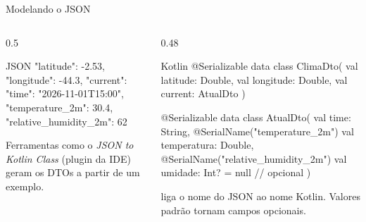 \documentclass[aspectratio=169,10pt]{beamer}
\begin{document}
\begin{frame}[fragile]{Modelando o JSON}
  \begin{columns}[T]
    \begin{column}{0.5\textwidth}
\begin{codigo}[title=Resposta da Open-Meteo (resumo)]{JSON}
{
  "latitude": -2.53,
  "longitude": -44.3,
  "current": {
    "time": "2026-11-01T15:00",
    "temperature_2m": 30.4,
    "relative_humidity_2m": 62
  }
}
\end{codigo}
      \begin{dica}
        Ferramentas como o \emph{JSON to Kotlin Class} (plugin da IDE) geram os DTOs a partir de um exemplo.
      \end{dica}
    \end{column}
    \begin{column}{0.48\textwidth}
\begin{codigo}[title=ClimaDto.kt]{Kotlin}
@Serializable
data class ClimaDto(
  val latitude: Double,
  val longitude: Double,
  val current: AtualDto
)

@Serializable
data class AtualDto(
  val time: String,
  @SerialName("temperature_2m")
  val temperatura: Double,
  @SerialName("relative_humidity_2m")
  val umidade: Int? = null     // opcional
)
\end{codigo}
      \begin{conceito}
         liga o nome do JSON ao nome Kotlin. Valores padrão tornam campos opcionais.
      \end{conceito}
    \end{column}
  \end{columns}
\end{frame}
\end{document}
